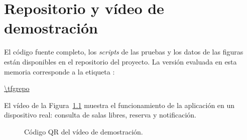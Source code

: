 \chapter{Repositorio y vídeo de demostración}
\label{ap:repositorio}

El código fuente completo, los \emph{scripts} de las pruebas y los datos de las
figuras están disponibles en el repositorio del proyecto. La versión evaluada
en esta memoria corresponde a la etiqueta \texttt{\tfgversion}:

\begin{center}
  \url{\tfgrepo}
\end{center}

El vídeo de la Figura~\ref{fig:qr} muestra el funcionamiento de la aplicación
en un dispositivo real: consulta de salas libres, reserva y notificación.

\begin{figure}[htbp]
  \centering
  {\hypersetup{urlcolor=black}\qrcode[height=3.2cm]{\tfgvideo}}
  \caption{Código QR del vídeo de demostración.}
  \label{fig:qr}
  \fuente{\url{\tfgvideo}}
\end{figure}
